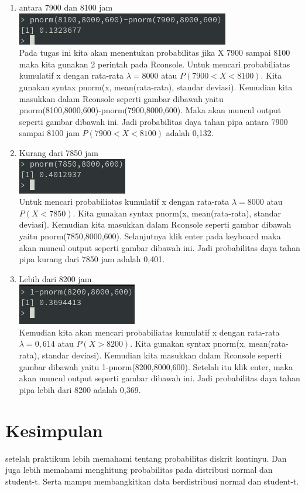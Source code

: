 \documentclass[a4paper,12pt]{article}
\begin{document}
\begin{enumerate}[label=\alph*.]
    \item antara 7900 dan 8100 jam\\
        \includegraphics{tugas2a}\\
        Pada tugas ini kita akan menentukan probabilitas jika X 7900 sampai 8100 maka kita gunakan 2 perintah pada Rconsole. Untuk mencari probabiliatas kumulatif x dengan rata-rata $\lambda = 8000$ atau $P(7900 < X < 8100)$. Kita gunakan syntax pnorm(x, mean(rata-rata), standar deviasi). Kemudian kita masukkan dalam Rconsole seperti gambar dibawah yaitu pnorm(8100,8000,600)-pnorm(7900,8000,600). Maka akan muncul output seperti gambar dibawah ini. Jadi probabilitas daya tahan pipa antara 7900 sampai
        8100 jam $P(7900 < X < 8100)$ adalah 0,132.
    \item Kurang dari 7850 jam\\
        \includegraphics{tugas2b}\\
        Untuk mencari probabiliatas kumulatif x dengan rata-rata $\lambda = 8000$ atau $P(X < 7850)$. Kita gunakan syntax pnorm(x, mean(rata-rata), standar deviasi). Kemudian kita masukkan dalam Rconsole seperti gambar dibawah yaitu pnorm(7850,8000,600). Selanjutnya klik enter pada keyboard maka akan muncul output seperti gambar dibawah ini. Jadi probabilitas daya tahan pipa kurang dari 7850 jam adalah 0,401.
    \item Lebih dari 8200 jam\\
        \includegraphics{tugas2c}\\
        Kemudian kita akan mencari probabiliatas kumulatif x dengan rata-rata $\lambda = 0,614$ atau $P(X > 8200)$. Kita gunakan syntax pnorm(x, mean(rata-rata), standar deviasi). Kemudian kita masukkan dalam Rconsole seperti gambar dibawah yaitu 1-pnorm(8200,8000,600). Setelah itu klik enter, maka akan muncul output seperti gambar dibawah ini. Jadi probabilitas daya tahan pipa lebih dari 8200 adalah 0,369.
\end{enumerate}

\newpage 
\section{Kesimpulan}
setelah praktikum lebih memahami tentang probabilitas diskrit kontinyu. Dan juga lebih memahami menghitung probabilitas pada distribusi normal dan student-t. Serta mampu membangkitkan data berdistribusi normal dan student-t.
\end{document}

